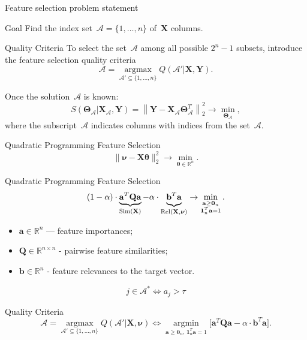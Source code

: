 \documentclass[9pt]{beamer}
\newcommand{\ba}{\mathbf{a}}
\newcommand{\bY}{\mathbf{Y}}
\newcommand{\bX}{\mathbf{X}}
\newcommand{\bQ}{\mathbf{Q}}
\newcommand{\bbR}{\mathbb{R}}
\newcommand{\cA}{\mathcal{A}}
\newcommand{\bnu}{\boldsymbol{\nu}}
\newcommand{\bOne}{\boldsymbol{1}}
\newcommand{\bZero}{\boldsymbol{0}}
\newcommand{\btheta}{\boldsymbol{\theta}}
\newcommand{\bTheta}{\boldsymbol{\Theta}}
\newcommand{\argmin}{\mathop{\arg \min}\limits}
\newcommand{\argmax}{\mathop{\arg \max}\limits}
\begin{document}
\begin{frame}{Feature selection problem statement}
\begin{block}{Goal}
Find the index set~$\cA = \{1, \dots, n\}$ of~$\bX$ columns. 
\end{block}
\begin{block}{Quality Criteria}
To select the set~$\cA$ among all possible $2^n - 1$ subsets, introduce the feature selection quality criteria
\[
\cA = \argmax_{\cA' \subseteq \{1, \dots, n\}} Q(\cA' | \bX, \bY).
\label{eq:subset_selection}
\]
\end{block}
Once the solution~$\cA$ is known:
\[
S(\bTheta_{\cA} | \bX_{\cA}, \bY) = {\left\| \mathbf{Y} - \bX_{\cA}\bTheta^T_{\cA} \right\| }_2^2 \rightarrow\min_{\bTheta_{\cA}},
\]
where the subscript~$\cA$ indicates columns with indices from the set~$\cA$.

\end{frame}
\begin{frame}{Quadratic Programming Feature Selection}
	\[
	\| \bnu - \bX \btheta\|_2^2 \rightarrow\min_{\btheta \in \bbR^{n}}.
	\]
	\begin{block}{Quadratic Programming Feature Selection}
	\vspace{-0.3cm}
	\[
	(1 - \alpha) \cdot \underbrace{\ba^{T} \bQ \ba}_{\text{Sim}(\bX)} - \alpha \cdot \underbrace{\vphantom{()} \mathbf{b}^{T} \ba}_{\text{Rel}(\bX, \bnu)} \rightarrow \min_{\substack{\ba \geq \bZero_n \\ \bOne_n^T \ba=1}}.
	\]
	\vspace{-0.3cm}
	\end{block}
		\begin{itemize}
			\item $\ba \in \bbR^n$ --- feature importances;
			\item $\bQ \in \bbR^{n \times n}$ - pairwise feature similarities;
			\item $\mathbf{b} \in \bbR^n$ - feature relevances to the target vector.
		\end{itemize}
	
	\begin{equation*}
	j \in \mathcal{A}^* \Leftrightarrow a_j > \tau
	\end{equation*}
	
	\begin{block}{Quality Criteria}
	\[
	\cA = \argmax_{\cA' \subseteq \{1, \dots, n\}} Q(\cA' | \bX, \bnu) \Leftrightarrow \argmin_{\ba \geq \bZero_n, \, \bOne_n^T\ba=1} \bigl[\ba^{T} \bQ \ba - \alpha \cdot \mathbf{b}^{T} \ba \bigr].
	\]
	\end{block}
\end{frame}
\end{document}
